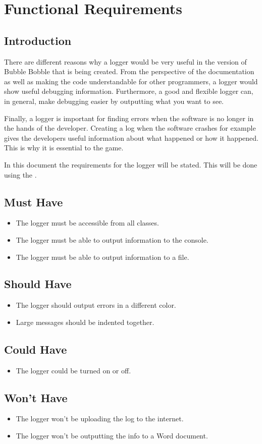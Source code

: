 \chapter{Functional Requirements}

\section{Introduction}
There are different reasons why a logger would be very useful in the version of Bubble Bobble that is being created. From the perspective of the documentation as well as making the code understandable for other programmers, a logger would show useful debugging information. Furthermore, a good and flexible logger can, in general, make debugging easier by outputting what you want to see.

Finally, a logger is important for finding errors when the software is no longer in the hands of the developer. Creating a log when the software crashes for example gives the developers useful information about what happened or how it happened. This is why it is essential to the game. 

In this document the requirements for the logger will be stated. This will be done using the .

\section{Must Have}
\begin{itemize}
\itemsep0em
\item The logger must be accessible from all classes.
\item The logger must be able to output information to the console.
\item The logger must be able to output information to a file.
\end{itemize}

\section{Should Have}
\begin{itemize}
\itemsep0em
\item The logger should output errors in a different color.
\item Large messages should be indented together.
\end{itemize}

\section{Could Have}
\begin{itemize}
\itemsep0em
\item The logger could be turned on or off.
\end{itemize}

\section{Won't Have}
\begin{itemize}
\itemsep0em
\item The logger won't be uploading the log to the internet.
\item The logger won't be outputting the info to a Word document.
\end{itemize}